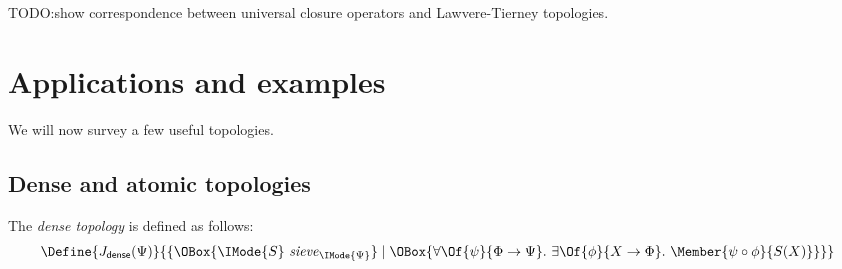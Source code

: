 \documentclass{article}
\newcommand\IsSieve[2]{\IMode{#2}\ \mathit{sieve}_{\IMode{#1}}}
\newcommand\JDense{J_{\mathsf{dense}}}
\newcommand\MkSet[1]{\{#1\}}
\begin{document}
TODO:\@ show correspondence between universal closure operators and
Lawvere-Tierney topologies.

\newpage
\section{Applications and examples}

We will now survey a few useful topologies.

\subsection{Dense and atomic topologies}

\begin{definition}
  The \emph{dense topology} is defined as follows:
  \[
    \Define{
      \JDense(\Psi)
    }{
      \MkSet{
        \OBox{
          \IsSieve{\Psi}{S}
        }
        \mid
        \OBox{
          \forall\Of{\psi}{\Phi\to\Psi}.\
          \exists\Of{\phi}{X\to\Phi}.\
          \Member{\psi\circ \phi}{S(X)}
        }
      }
    }
  \]
\end{definition}
\end{document}
